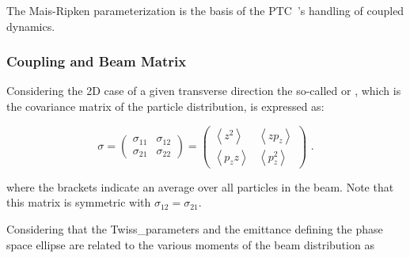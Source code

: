 The Mais-Ripken parameterization is the basis of the \gls{PTC}~\cite{CODE:Schmidt_Forest:PTC}'s handling of coupled dynamics. 

\subsubsection*{Coupling and Beam Matrix}

Considering the \num{2}D case of a given transverse direction the so-called  or , which is the covariance matrix of the particle distribution, is expressed as:

\begin{equation}
    \sigma = \begin{pmatrix}
        \sigma_{11} & \sigma_{12} \\
        \sigma_{21} & \sigma_{22}
    \end{pmatrix} = \begin{pmatrix}
        \left\langle z^2 \right\rangle   & \left\langle z p_z \right\rangle   \\
        \left\langle p_z z \right\rangle & \left\langle p_{z}^2 \right\rangle
    \end{pmatrix}  \text{ .}
    \label{equation:2d_sigma_matrix}
\end{equation}
\vspace{1pt}

\noindent
where the brackets indicate an average over all particles in the beam.
Note that this matrix is symmetric with \(\sigma_{12} = \sigma_{21}\).

Considering that the \gls{Twiss_parameters} and the emittance defining the phase space ellipse are related to the various moments of the beam distribution as

